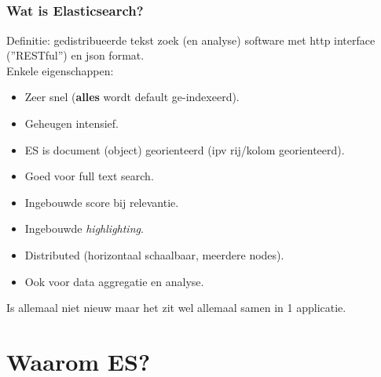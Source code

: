 \subsection{}
\begin{styleframe}
    \frametitle{Wat is Elasticsearch?}
\pause
Definitie: gedistribueerde tekst zoek (en analyse) software met http interface (''RESTful'') en json format.\\
\pause
Enkele eigenschappen: 
\begin{itemize}[<+>]
	\item Zeer snel (\textbf{alles} wordt default ge-indexeerd).
	\item Geheugen intensief.
	\item ES is document (object) georienteerd (ipv rij/kolom georienteerd).
	\item Goed voor full text search.
	\item Ingebouwde score bij relevantie.
	\item Ingebouwde {\it highlighting}.
	\item Distributed (horizontaal schaalbaar, meerdere nodes).
	\item Ook voor data aggregatie en analyse.
\end{itemize}
\pause
Is allemaal niet nieuw maar het zit wel allemaal samen in 1 applicatie.
\end{styleframe}

\section{Waarom ES?}
